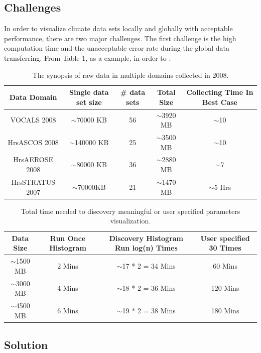 \documentclass[times, 10pt,onecolumn]{article} %
\begin{document}
\subsection{Challenges} 
In order to visualize climate data sets locally and globally with acceptable performance, there are two major challenges. The first challenge is the high computation time and the unacceptable error rate during the global data transferring. From Table 1, as a example, in order to .

\begin{table}[!iht]
\centering
\begin{tabular}{|c|c|c|c|c|}
\hline
\textbf{Data Domain} & \textbf{Single data set size} & \textbf{\# data sets} & \textbf{Total Size} & \textbf{ Collecting Time In Best Case} \\ \hline
VOCALS 2008 & $\sim$70000 KB & 56 & $\sim$3920 MB & $\sim$10 \\ \hline
HrsASCOS 2008 & $\sim$140000 KB & 25&  $\sim$3500 MB & $\sim$10 \\ \hline 
HrsAEROSE 2008 & $\sim$80000 KB & 36&  $\sim$2880 MB & $\sim$7 \\ \hline 
HrsSTRATUS 2007 & $\sim$70000KB & 21&  $\sim$1470 MB & $\sim$5 Hrs \\ \hline
\end{tabular}
\caption{The synopsis of raw data in multiple domains collected in 2008.}
\label{tbl:rawdata}
\end{table}


\begin{table}[!iht]
\centering
\begin{tabular}{|c|c|c|c|}
\hline
\textbf{Data Size} & \textbf{Run Once Histogram} & \textbf{Discovery Histogram Run log(n) Times} & \textbf{User specified 30 Times} \\ \hline
$\sim$1500 MB & 2 Mins & $\sim$17 * 2 = 34 Mins & 60 Mins \\ \hline
$\sim$3000 MB & 4 Mins &  $\sim$18 * 2 = 36 Mins & 120 Mins \\ \hline 
$\sim$4500 MB & 6 Mins &  $\sim$19 * 2 = 38 Mins & 180 Mins \\ \hline 
\end{tabular}
\caption{Total time needed to discovery meaningful or user specified parameters visualization.}
\label{tbl:time}
\end{table}

\subsection{Solution}
\end{document}
